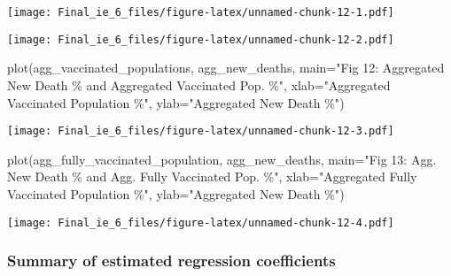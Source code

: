 \documentclass[
  12pt,
]{article}
\newenvironment{Shaded}{\begin{snugshade}}{\end{snugshade}}
\newcommand{\AttributeTok}[1]{\textcolor[rgb]{0.77,0.63,0.00}{#1}}
\newcommand{\FunctionTok}[1]{\textcolor[rgb]{0.00,0.00,0.00}{#1}}
\newcommand{\NormalTok}[1]{#1}
\newcommand{\SpecialCharTok}[1]{\textcolor[rgb]{0.00,0.00,0.00}{#1}}
\newcommand{\StringTok}[1]{\textcolor[rgb]{0.31,0.60,0.02}{#1}}
\begin{document}
\texttt{[image: Final\_ie\_6\_files/figure-latex/unnamed-chunk-12-1.pdf]}

\begin{Shaded}
\end{Shaded}

\texttt{[image: Final\_ie\_6\_files/figure-latex/unnamed-chunk-12-2.pdf]}

\begin{Shaded}
\begin{Highlighting}[]
\FunctionTok{plot}\NormalTok{(agg\_vaccinated\_populations, agg\_new\_deaths, }\AttributeTok{main=}\StringTok{"Fig 12: Aggregated New Death \% and Aggregated Vaccinated Pop. \%"}\NormalTok{, }\AttributeTok{xlab=}\StringTok{"Aggregated Vaccinated Population \%"}\NormalTok{, }\AttributeTok{ylab=}\StringTok{"Aggregated New Death \%"}\NormalTok{)}
\end{Highlighting}
\end{Shaded}

\texttt{[image: Final\_ie\_6\_files/figure-latex/unnamed-chunk-12-3.pdf]}

\begin{Shaded}
\begin{Highlighting}[]
\FunctionTok{plot}\NormalTok{(agg\_fully\_vaccinated\_population, agg\_new\_deaths, }\AttributeTok{main=}\StringTok{"Fig 13: Agg. New Death \% and Agg. Fully Vaccinated Pop. \%"}\NormalTok{, }\AttributeTok{xlab=}\StringTok{"Aggregated Fully Vaccinated Population \%"}\NormalTok{, }\AttributeTok{ylab=}\StringTok{"Aggregated New Death \%"}\NormalTok{)}
\end{Highlighting}
\end{Shaded}

\texttt{[image: Final\_ie\_6\_files/figure-latex/unnamed-chunk-12-4.pdf]}

\hypertarget{summary-of-estimated-regression-coefficients}{%
\subsubsection{Summary of estimated regression
coefficients}\label{summary-of-estimated-regression-coefficients}}
\end{document}
